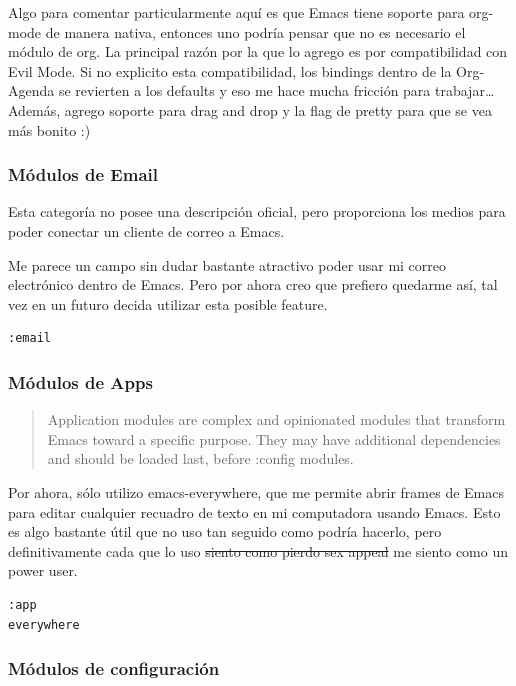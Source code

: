 \documentclass[11pt]{article}
\begin{document}
Algo para comentar particularmente aquí es que Emacs tiene soporte para org-mode de manera nativa, entonces uno podría pensar que no es necesario el módulo de org. La principal razón por la que lo agrego es por compatibilidad con Evil Mode. Si no explicito esta compatibilidad, los bindings dentro de la Org-Agenda se revierten a los defaults y eso me hace mucha fricción para trabajar\ldots{} Además, agrego soporte para drag and drop y la flag de pretty para que se vea más bonito :)
\subsubsection{Módulos de Email}
\label{sec:orgc8c299c}

Esta categoría no posee una descripción oficial, pero proporciona los medios para poder conectar un cliente de correo a Emacs.

Me parece un campo sin dudar bastante atractivo poder usar mi correo electrónico dentro de Emacs. Pero por ahora creo que prefiero quedarme así, tal vez en un futuro decida utilizar esta posible feature.

\begin{verbatim}
:email

\end{verbatim}
\subsubsection{Módulos de Apps}
\label{sec:org069af4c}

\begin{quote}
Application modules are complex and opinionated modules that transform Emacs toward a specific purpose. They may have additional dependencies and should be loaded last, before :config modules.
\end{quote}

Por ahora, sólo utilizo emacs-everywhere, que me permite abrir frames de Emacs para editar cualquier recuadro de texto en mi computadora usando Emacs. Esto es algo bastante útil que no uso tan seguido como podría hacerlo, pero definitivamente cada que lo uso \sout{siento como pierdo sex appeal} me siento como un power user.

\begin{verbatim}
:app
everywhere

\end{verbatim}
\subsubsection{Módulos de configuración}
\label{sec:org95dfcd7}
\end{document}
